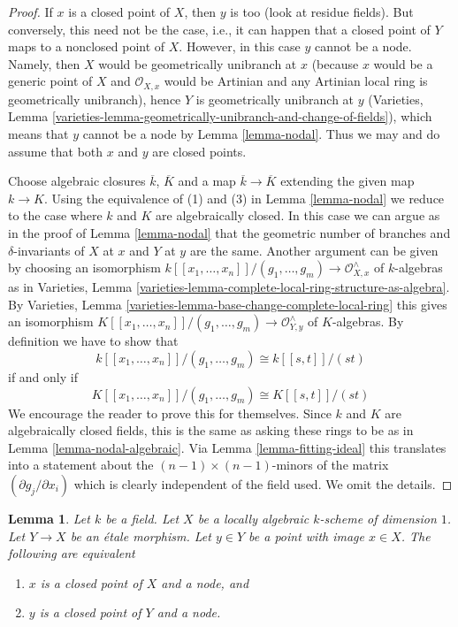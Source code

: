 \documentclass{stacks-project}
\theoremstyle{plain}
\newtheorem{lemma}[subsection]{Lemma}
\theoremstyle{definition}
\theoremstyle{remark}
\numberwithin{equation}{subsection}
\begin{document}
\begin{proof}
If $x$ is a closed point of $X$, then $y$ is too (look at residue fields).
But conversely, this need not be the case, i.e., it can happen that a
closed point of $Y$ maps to a nonclosed point of $X$. However, in this
case $y$ cannot be a node. Namely, then $X$ would be geometrically
unibranch at $x$ (because $x$ would be a generic point of $X$ and
$\mathcal{O}_{X, x}$ would be Artinian and any Artinian local ring is
geometrically unibranch), hence $Y$ is geometrically unibranch at $y$
(Varieties, Lemma
\ref{varieties-lemma-geometrically-unibranch-and-change-of-fields}),
which means that $y$ cannot be a node by Lemma \ref{lemma-nodal}.
Thus we may and do assume that both $x$ and $y$ are closed points.

\medskip\noindent
Choose algebraic closures $\overline{k}$, $\overline{K}$
and a map $\overline{k} \to \overline{K}$ extending the
given map $k \to K$. Using the equivalence of (1) and (3)
in Lemma \ref{lemma-nodal}
we reduce to the case where $k$ and $K$ are algebraically closed.
In this case we can argue as in the proof of
Lemma \ref{lemma-nodal} that the geometric number of branches
and $\delta$-invariants of $X$ at $x$ and $Y$ at $y$ are the same.
Another argument can be given by choosing an isomorphism
$k[[x_1, \ldots, x_n]]/(g_1, \ldots, g_m) \to \mathcal{O}_{X, x}^\wedge$
of $k$-algebras as in Varieties, Lemma
\ref{varieties-lemma-complete-local-ring-structure-as-algebra}.
By Varieties, Lemma \ref{varieties-lemma-base-change-complete-local-ring}
this gives an isomorphism
$K[[x_1, \ldots, x_n]]/(g_1, \ldots, g_m) \to \mathcal{O}_{Y, y}^\wedge$
of $K$-algebras. By definition we have to show that
$$
k[[x_1, \ldots, x_n]]/(g_1, \ldots, g_m) \cong k[[s, t]]/(st)
$$
if and only if
$$
K[[x_1, \ldots, x_n]]/(g_1, \ldots, g_m) \cong K[[s, t]]/(st)
$$
We encourage the reader to prove this for themselves.
Since $k$ and $K$ are algebraically closed fields, this is the same as
asking these rings to be as in Lemma \ref{lemma-nodal-algebraic}.
Via Lemma \ref{lemma-fitting-ideal} this translates into a statement
about the $(n - 1) \times (n - 1)$-minors of the matrix
$(\partial g_j/\partial x_i)$ which is clearly independent of the
field used. We omit the details.
\end{proof}

\begin{lemma}
\label{lemma-node-etale-local}
Let $k$ be a field. Let $X$ be a locally algebraic
$k$-scheme of dimension $1$. Let $Y \to X$ be an \'etale morphism.
Let $y \in Y$ be a point with image $x \in X$. The following are equivalent
\begin{enumerate}
\item $x$ is a closed point of $X$ and a node, and
\item $y$ is a closed point of $Y$ and a node.
\end{enumerate}
\end{lemma}
\end{document}

